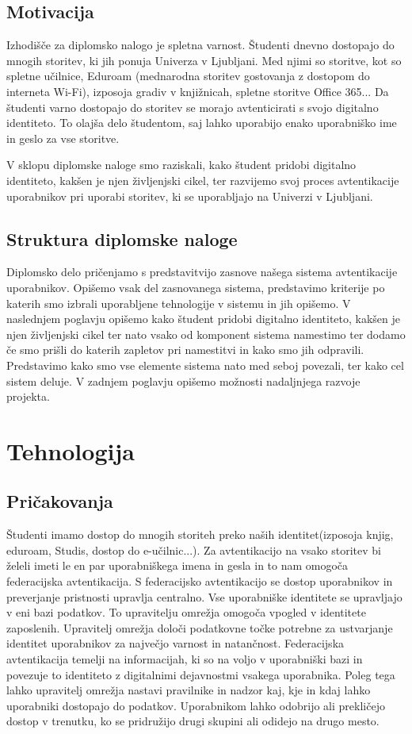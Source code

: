 \documentclass[a4paper,12pt,openright]{book}
\begin{document}
\section{Motivacija}
Izhodišče za diplomsko nalogo je spletna varnost. Študenti dnevno dostopajo do mnogih storitev, ki jih ponuja Univerza v Ljubljani. Med njimi so storitve, kot so spletne učilnice, Eduroam (mednarodna storitev gostovanja z dostopom do interneta Wi-Fi), izposoja gradiv v knjižnicah, spletne storitve Office 365... Da študenti varno dostopajo do storitev se morajo avtenticirati s svojo digitalno identiteto. To olajša delo študentom, saj lahko uporabijo enako uporabniško ime in geslo za vse storitve.

V sklopu diplomske naloge smo raziskali, kako študent pridobi digitalno identiteto, kakšen je njen življenjski cikel, ter razvijemo svoj proces avtentikacije uporabnikov pri uporabi storitev, ki se uporabljajo na Univerzi v Ljubljani.

\section{Struktura diplomske naloge}
Diplomsko delo pričenjamo s predstavitvijo zasnove našega sistema avtentikacije uporabnikov. Opišemo vsak del zasnovanega sistema, predstavimo kriterije po katerih smo izbrali uporabljene tehnologije v sistemu in jih opišemo. 
V naslednjem poglavju opišemo kako študent pridobi digitalno identiteto, kakšen je njen življenjski cikel ter nato vsako od komponent sistema namestimo ter dodamo če smo prišli do katerih zapletov pri namestitvi in kako smo jih odpravili. 
Predstavimo kako smo vse elemente sistema nato med seboj povezali, ter kako cel sistem deluje.
V zadnjem poglavju opišemo možnosti nadaljnjega razvoje projekta.

\chapter{Tehnologija}
\section{Pričakovanja}

Študenti imamo dostop do mnogih storiteh preko naših identitet(izposoja knjig, eduroam, Studis, dostop do e-učilnic...). Za avtentikacijo na vsako storitev bi želeli imeti le en par uporabniškega imena in gesla in to nam omogoča federacijska avtentikacija. S federacijsko avtentikacijo se dostop uporabnikov in preverjanje pristnosti upravlja centralno. Vse uporabniške identitete se upravljajo v eni bazi podatkov. To upravitelju omrežja omogoča vpogled v identitete zaposlenih. Upravitelj omrežja določi podatkovne točke potrebne za ustvarjanje identitet uporabnikov za največjo varnost in natančnost. Federacijska avtentikacija temelji na informacijah, ki so na voljo v uporabniški bazi in povezuje to identiteto z digitalnimi dejavnostmi vsakega uporabnika. Poleg tega lahko upravitelj omrežja nastavi pravilnike in nadzor kaj, kje in kdaj lahko uporabniki dostopajo do podatkov. Uporabnikom lahko odobrijo ali prekličejo dostop v trenutku, ko se pridružijo drugi skupini ali odidejo na drugo mesto.
\newline
\end{document}
